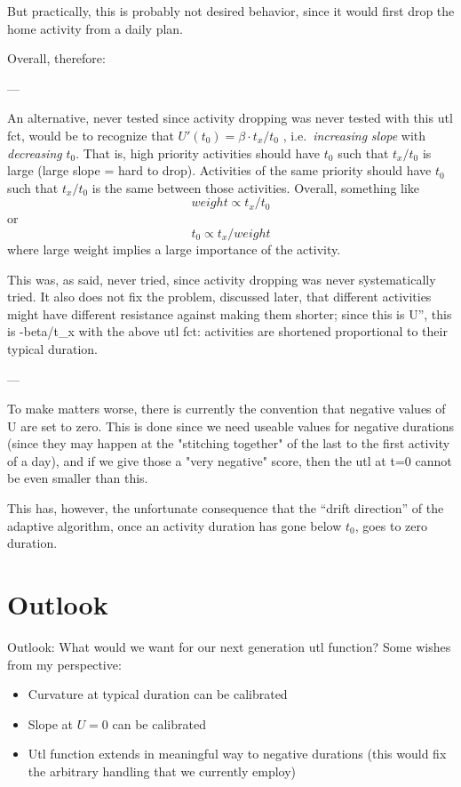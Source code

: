 But practically, this is probably not desired behavior, since it would first drop the home activity from a daily plan.

Overall, therefore: 

---

An  alternative, never tested since activity dropping was never  tested with  this utl fct, would be to recognize that $U'(t_0) = \beta \cdot  t_x / t_0$ ,  i.e.\ \emph{increasing} \emph{slope} with \emph{decreasing}  $t_0$.  That is, high priority activities should have $t_0$ such that  $t_x/t_0$ is  large (large slope = hard to drop). Activities of the  same priority  should have $t_0$ such that $t_x/t_0$ is the same between  those activities.  Overall, something like
\[
weight \propto t_x/t_0
\]
or
\[
t_0 \propto t_x/weight
\]
where large weight implies a large importance of the activity.

This  was, as said, never tried, since activity dropping was never   systematically tried. It also does not fix the problem, discussed   later, that different activities might have different resistance  against  making them shorter; since this is U'', this is -beta/t\_x  with the  above utl fct: activities are shortened proportional to their  typical  duration.

---

To make matters worse, there is currently the  convention that  negative values of U are set to zero. This is done  since we need  useable values for negative durations (since they may  happen at the  "stitching together" of the last to the first activity of a  day), and  if we give those a "very negative" score, then the utl at t=0  cannot be  even smaller than this.

This has, however, the  unfortunate consequence that the ``drift  direction'' of the adaptive  algorithm, once an activity duration has  gone below $t_0$, goes to zero  duration.

\section{Outlook}

Outlook: What would we want for our next generation utl function? Some wishes from my perspective:
\begin{itemize}
	\item Curvature at typical duration can be calibrated
	\item Slope at $U=0$ can be calibrated
	\item Utl function extends in meaningful way to negative durations (this would fix the arbitrary handling that we currently employ)
\end{itemize}

